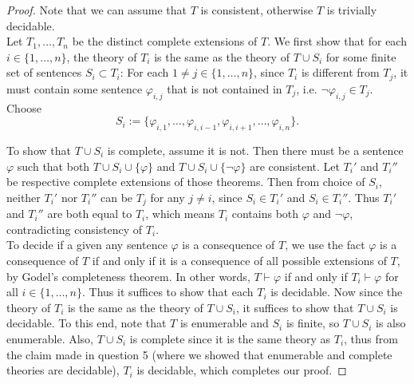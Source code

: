 \documentclass{article}
\begin{document}
\begin{enumerate}[label={\bf Q\arabic*:}]
    \begin{proof}
      Note that we can assume that $T$ is consistent, otherwise $T$ is
      trivially decidable. \\

      Let $T_1,\ldots,T_n$ be the distinct complete extensions of $T$.
      We first show that for each $i\in\{1,\ldots,n\}$, the theory of $T_i$
      is the same as the theory of $T\cup S_i$ for some finite set of
      sentences $S_i\subset T_i$: For each $1\neq j\in\{1,\ldots,n\}$,
      since $T_i$ is different from $T_j$, it must contain some sentence
      $\varphi_{i,j}$ that is not contained in $T_j$, i.e.
      $\neg\varphi_{i,j}\in T_j$. Choose
      \[S_i :=\{\varphi_{i,1},\ldots,\varphi_{i,i-1},
      \varphi_{i,i+1},\ldots,\varphi_{i,n}\}.\]

      To show that $T\cup S_i$ is complete, assume it is not. Then there
      must be a sentence $\varphi$ such that both $T\cup
      S_i\cup\{\varphi\}$ and $T\cup S_i\cup\{\neg\varphi\}$ are
      consistent. Let $T_i'$ and $T_i''$ be respective complete extensions
      of those theorems. Then from choice of $S_i$, neither $T_i'$ nor
      $T_i''$ can be $T_j$ for any $j\neq i$, since $S_i\in T_i'$ and
      $S_i\in T_i''$. Thus $T_i'$ and $T_i''$ are both equal to $T_i$,
      which means $T_i$ contains both $\varphi$ and $\neg\varphi$,
      contradicting consistency of $T_i$. \\

      To decide if a given any sentence $\varphi$ is a consequence of $T$,
      we use the fact $\varphi$ is a consequence of $T$ if and only if it
      is a consequence of all possible extensions of $T$, by Godel's
      completeness theorem. In other words, $T\vdash\varphi$ if and only if
      $T_i\vdash\varphi$ for all $i\in\{1,\ldots,n\}$. Thus it suffices to
      show that each $T_i$ is decidable. Now since the theory of $T_i$ is
      the same as the theory of $T\cup S_i$, it suffices to show that
      $T\cup S_i$ is decidable. To this end, note that $T$ is enumerable
      and $S_i$ is finite, so $T\cup S_i$ is also enumerable. Also, $T\cup
      S_i$ is complete since it is the same theory as $T_i$, thus from the
      claim made in question 5 (where we showed that enumerable and
      complete theories are decidable), $T_i$ is decidable, which completes
      our proof.
    \end{proof}
\end{enumerate}
\end{document}
